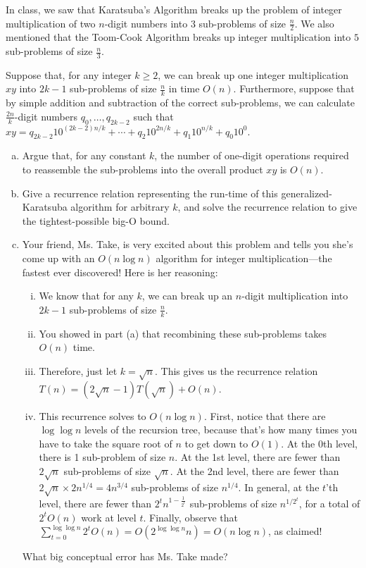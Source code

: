 \documentclass{article}
\begin{document}
\begin{exercise}[subtitle={Generalized Karatsuba (6 pts)}]
In class, we saw that Karatsuba's Algorithm breaks up the problem of integer multiplication of two $n$-digit numbers into $3$ sub-problems of size $\frac{n}{2}$. We also mentioned that the Toom-Cook Algorithm breaks up integer multiplication into $5$ sub-problems of size $\frac{n}{3}$.

Suppose that, for any integer $k \geq 2$, we can break up one integer multiplication $xy$ into $2k-1$ sub-problems of size $\frac{n}{k}$ in time $O(n)$. Furthermore, suppose that by simple addition and subtraction of the correct sub-problems, we can calculate $\frac{2n}{k}$-digit numbers $q_0,\dots,q_{2k-2}$ such that $xy = q_{2k-2} 10^{(2k-2)n/k} + \cdots + q_2 10^{2n/k} + q_{1} 10^{n/k} + q_0 10^{0}$.
\begin{enumerate}[(a)]
\item Argue that, for any constant $k$, the number of one-digit operations required to reassemble the sub-problems into the overall product $xy$ is $O(n)$.
\item Give a recurrence relation representing the run-time of this generalized-Karatsuba algorithm for arbitrary $k$, and solve the recurrence relation to give the tightest-possible big-O bound.
\item Your friend, Ms. Take, is very excited about this problem and tells you she's come up with an $O(n \log n)$ algorithm for integer multiplication---the fastest ever discovered! Here is her reasoning:
	\begin{enumerate}[i.]
	\item We know that for any $k$, we can break up an $n$-digit multiplication into $2k-1$ sub-problems of size $\frac{n}{k}$.
	\item You showed in part (a) that recombining these sub-problems takes $O(n)$ time.
	\item Therefore, just let $k=\sqrt{n}$. This gives us the recurrence relation $T(n) = (2\sqrt{n}-1)T(\sqrt{n}) + O(n)$.
	\item This recurrence solves to $O(n \log n)$. First, notice that there are $\log \log n$ levels of the recursion tree, because that's how many times you have to take the square root of $n$ to get down to $O(1)$. At the 0th level, there is 1 sub-problem of size $n$. At the 1st level, there are fewer than $2 \sqrt{n}$ sub-problems of size $\sqrt{n}$. At the 2nd level, there are fewer than $2 \sqrt{n} \times 2 n^{1/4} = 4 n^{3/4}$ sub-problems of size $n^{1/4}$. In general, at the $t$'th level, there are fewer than $2^{t} n^{1 - \frac{1}{2^t}}$ sub-problems of size $n^{1/2^t}$, for a total of $2^t O(n)$ work at level $t$. Finally, observe that $\sum_{t=0}^{\log \log n} 2^t O(n) = O(2^{\log\log n} n) = O( n\log n)$, as claimed!
	\end{enumerate}
What big conceptual error has Ms. Take made?
\end{enumerate}
\end{exercise}
\end{document}
